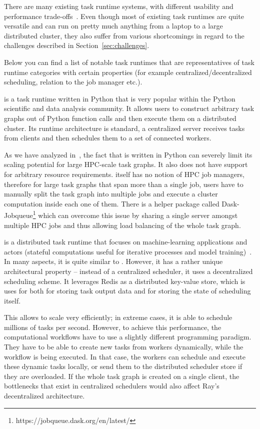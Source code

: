 There are many existing task runtime systems, with different usability and performance
trade-offs~\cite{dask, nextflow, snakemake, pycompss, parsl, ray}. Even though most of existing
task runtimes are quite versatile and can run on pretty much anything from a laptop to a large
distributed cluster, they also suffer from various shortcomings in regard to the challenges
described in Section~\ref{sec:challenges}.


Below you can find a list of notable task runtimes that are representatives of task runtime
categories with certain properties (for example centralized/decentralized scheduling,
relation to the job manager etc.).

\dask{} is a task runtime written in Python that is very popular within the Python
scientific and data analysis community\cite{dask,dask-user-survey}. It allows users to construct
arbitrary task graphs out of Python function calls and then execute them on a distributed cluster.
Its runtime architecture is standard, a centralized server receives tasks from clients and
then schedules them to a set of connected workers.

As we have analyzed in~\cite{rsds}, the fact that \dask{} is written in Python can severely limit
its scaling potential for large HPC-scale task graphs. It also does not have support for arbitrary
resource requirements. \dask{} itself has no notion of HPC job managers, therefore for large task
graphs that span more than a single job, users have to manually split the task graph into
multiple jobs and execute a \dask{} cluster computation inside each one of them. There is a helper
package called Dask-Jobqueue\footnote{https://jobqueue.dask.org/en/latest/} which can overcome this
issue by sharing a single server amongst multiple HPC jobs and thus allowing load balancing of
the whole task graph.

\ray{} is a distributed task runtime that focuses on machine-learning applications and
actors (stateful computations useful for iterative processes and model training)~\cite{ray}.
In many aspects, it is quite similar to \dask{}. However, it has a rather unique architectural
property -- instead of a centralized scheduler, it uses a decentralized scheduling scheme. It
leverages Redis as a distributed key-value store, which is uses for both for storing task
output data and for storing the state of scheduling itself.

This allows \ray{} to scale very efficiently; in extreme cases, it is able to schedule millions
of tasks per second. However, to achieve this performance, the computational workflows have to use
a slightly different programming paradigm. They have to be able to create new tasks from workers
dynamically, while the workflow is being executed. In that case, the workers can schedule and
execute these dynamic tasks locally, or send them to the distributed scheduler store if they are
overloaded. If the whole task graph is created on a single client, the bottlenecks that exist in
centralized schedulers would also affect Ray's decentralized architecture.

